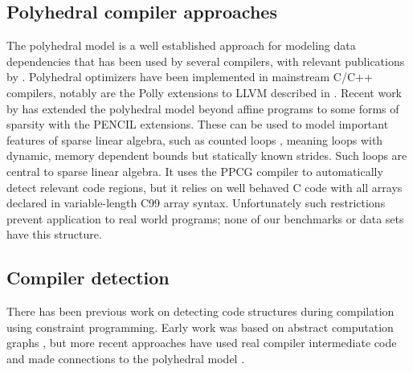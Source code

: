 \subsection{Polyhedral compiler approaches}

    The polyhedral model is a well established approach for modeling data
    dependencies that has been used by several compilers, with relevant
    publications by \citet{redon1994scheduling, jouvelot1989unified,
    chi1997optimizing, gupta2006simplifying, stock2014framework}.
    Polyhedral optimizers have been implemented in mainstream C/C++ compilers,
    notably are the Polly extensions to LLVM described in
    \cite{Doerfert2015Polly}.
    Recent work by \citet{7429301} has extended the polyhedral model beyond
    affine programs to some forms of sparsity with the PENCIL extensions.
    These can be used to model important features of sparse linear algebra, such
    as counted loops \citep{Zhao:2018:PCF:3178372.3179509}, meaning loops with
    dynamic, memory dependent bounds but statically known strides.
    Such loops are central to sparse linear algebra.
    It uses the PPCG compiler \citep{Verdoolaege:2013:PPC:2400682.2400713} to
    automatically detect relevant code regions, but it relies on well behaved C
    code with all arrays declared in variable-length C99 array syntax.
    Unfortunately such restrictions prevent application to real world programs;
    none of our benchmarks or data sets have this structure.

\subsection{Compiler detection}

    There has been previous work on
    detecting code structures during compilation using constraint programming.
    Early work was based on abstract computation graphs
    \cite{pinter1994program}, but more recent approaches have used real
    compiler intermediate code and made connections to the polyhedral
    model \cite{Ginsbach:2018:CDS:3178372.3179515}.

